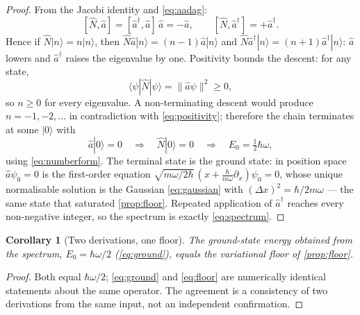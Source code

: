 \documentclass[11pt]{amsbook}
\theoremstyle{plain}
\newtheorem{corollary}[theorem]{Corollary}
\theoremstyle{definition}
\theoremstyle{remark}
\newcommand{\uses}[1]{\par\nopagebreak\noindent{\footnotesize\emph{Uses: #1.}\par}}
\begin{document}
\begin{proof}
From the Jacobi identity and \cref{eq:aadag}:
\begin{equation}\label{eq:nshift}
[\hat N, \hat a] = [\hat a^{\dagger}, \hat a]\, \hat a = -\hat a,
\qquad
[\hat N, \hat a^{\dagger}] = +\hat a^{\dagger}.
\end{equation}
Hence if $\hat N |n\rangle = n |n\rangle$, then $\hat N \hat a |n\rangle = (n-1)\hat a |n\rangle$ and $\hat N \hat a^{\dagger}|n\rangle = (n+1)\hat a^{\dagger}|n\rangle$: $\hat a$ lowers and $\hat a^{\dagger}$ raises the eigenvalue by one. Positivity bounds the descent: for any state,
\begin{equation}\label{eq:positivity}
\langle \psi | \hat N | \psi \rangle = \| \hat a \psi \|^{2} \geq 0,
\end{equation}
so $n \geq 0$ for every eigenvalue. A non-terminating descent would produce $n = -1, -2, \ldots$ in contradiction with \cref{eq:positivity}; therefore the chain terminates at some $|0\rangle$ with
\begin{equation}\label{eq:ground}
\hat a |0\rangle = 0 \quad\Longrightarrow\quad \hat N |0\rangle = 0 \quad\Longrightarrow\quad E_{0} = \tfrac{1}{2}\hbar\omega,
\end{equation}
using \cref{eq:numberform}. The terminal state is the ground state: in position space $\hat a \psi_0 = 0$ is the first-order equation $\sqrt{m\omega/2\hbar}\,(x + \frac{\hbar}{m\omega}\partial_x)\psi_0 = 0$, whose unique normalisable solution is the Gaussian \cref{eq:gaussian} with $(\Delta x)^2 = \hbar/2m\omega$ --- the same state that saturated \cref{prop:floor}. Repeated application of $\hat a^{\dagger}$ reaches every non-negative integer, so the spectrum is exactly \cref{eq:spectrum}.
\end{proof}

\begin{corollary}[Two derivations, one floor]\label{cor:consistency}
The ground-state energy obtained from the spectrum, $E_{0} = \hbar\omega/2$ (\cref{eq:ground}), equals the variational floor of \cref{prop:floor}.
\uses{\cref{thm:spectrum}, \cref{prop:floor}}
\end{corollary}

\begin{proof}
Both equal $\hbar\omega/2$; \cref{eq:ground} and \cref{eq:floor} are numerically identical statements about the same operator. The agreement is a consistency of two derivations from the same input, not an independent confirmation.
\end{proof}
\end{document}
